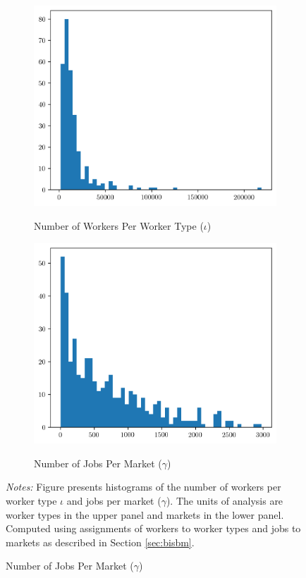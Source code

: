 \documentclass[12pt]{article}
\def\g{\gamma}
\def\i{\iota}
\theoremstyle{definition}
\theoremstyle{plain}
\begin{document}




\begin{figure}
	\centering
	\caption{Worker Type ($\i$) and Market ($\g$) Size Distributions}
	\begin{subfigure}{\textwidth}
		\centering
		\caption{Number of Workers Per Worker Type ($\i$)}
		\includegraphics[width=0.7\linewidth]{../Results/iota_size_distribution}
		\label{fig:iota_size_distribution}
	\end{subfigure}
	\begin{subfigure}{\textwidth}
		\centering
		\caption{Number of Jobs Per Market ($\g$)}
		\includegraphics[width=0.7\linewidth]{../Results/gamma_size_distribution}
		\label{fig:gamma_size_distribution}
	\end{subfigure}
	\label{fig:iota_gamma_size_distribution}
	\footnotesize\flushleft \emph{Notes:} Figure presents histograms of the number of workers per worker type $\i$ and jobs per market ($\g$). The units of analysis are worker types in the upper panel and markets in the lower panel. Computed using assignments of workers to worker types and jobs to markets as described in Section \ref{sec:bisbm}.
\end{figure}
\end{document}
